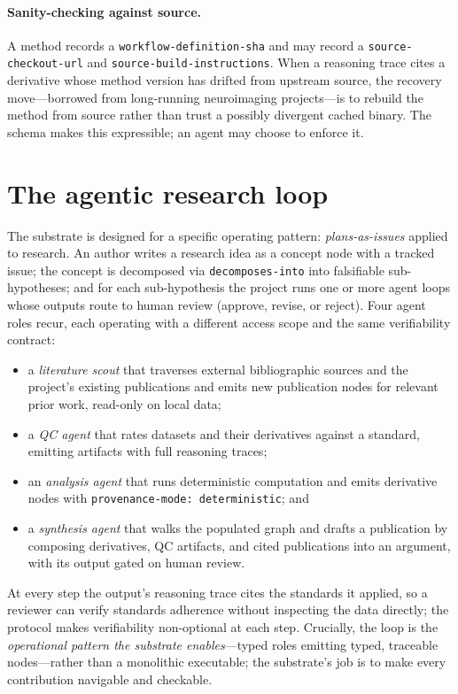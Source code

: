 \documentclass[preprint]{glimmer-paper}
\newcommand{\code}[1]{\texttt{#1}}
\newcommand{\node}[1]{\textsf{#1}}
\begin{document}
\paragraph{Sanity-checking against source.} A method records a
\code{workflow-definition-sha} and may record a \code{source-checkout-url} and
\code{source-build-instructions}. When a reasoning trace cites a derivative whose method
version has drifted from upstream source, the recovery move---borrowed from long-running
neuroimaging projects---is to rebuild the method from source rather than trust a possibly
divergent cached binary. The schema makes this expressible; an agent may choose to enforce
it.

\section{The agentic research loop}
\label{sec:loop}

The substrate is designed for a specific operating pattern: \emph{plans-as-issues} applied
to research. An author writes a research idea as a \node{concept} node with a tracked
issue; the concept is decomposed via \code{decomposes-into} into falsifiable
sub-hypotheses; and for each sub-hypothesis the project runs one or more agent loops whose
outputs route to human review (approve, revise, or reject). Four agent roles recur, each
operating with a different access scope and the same verifiability contract:

\begin{itemize}
  \item a \emph{literature scout} that traverses external bibliographic sources and the
  project's existing publications and emits new \node{publication} nodes for relevant prior
  work, read-only on local data;
  \item a \emph{QC agent} that rates datasets and their derivatives against a standard,
  emitting artifacts with full reasoning traces;
  \item an \emph{analysis agent} that runs deterministic computation and emits
  \node{derivative} nodes with \code{provenance-mode: deterministic}; and
  \item a \emph{synthesis agent} that walks the populated graph and drafts a
  \node{publication} by composing derivatives, QC artifacts, and cited publications into an
  argument, with its output gated on human review.
\end{itemize}

At every step the output's reasoning trace cites the standards it applied, so a reviewer
can verify standards adherence without inspecting the data directly; the protocol makes
verifiability non-optional at each step. Crucially, the loop is the \emph{operational
pattern the substrate enables}---typed roles emitting typed, traceable nodes---rather than
a monolithic executable; the substrate's job is to make every contribution navigable and
checkable.
\end{document}
